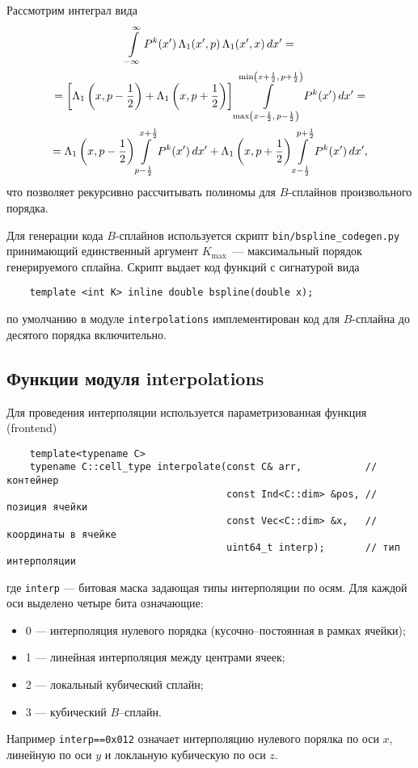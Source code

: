 Рассмотрим интеграл вида
\begin{multline}
  \int\limits_{-\infty}^{\infty} P^k(x')\,
  \Lambda_1(x',p)\,\Lambda_1(x', x)\, dx'
=\\=
\left[\Lambda_1\left(x,p-\frac12\right)+\Lambda_1\left(x,p+\frac12\right)\right]
\int\limits_{\max\left(x-\frac12,\,p-\frac12\right)}^{\min\left(x+\frac12,\,p+\frac12\right)}
P^k(x')\, dx'
=\\=
\Lambda_1\left(x,p-\frac12\right)\int\limits_{p-\frac12}^{x+\frac12} P^k(x')\,dx'
+
\Lambda_1\left(x,p+\frac12\right)\int\limits_{x-\frac12}^{p+\frac12} P^k(x')\,dx',
\notag
\end{multline}
что позволяет рекурсивно рассчитывать полиномы для $B$-сплайнов
произвольного порядка.

Для генерации кода $B$-сплайнов используется скрипт
\verb'bin/bspline_codegen.py' принимающий единственный аргумент $K_{\max}$~---
максимальный порядок генерируемого сплайна. Скрипт выдает код функций
с сигнатурой вида
\begin{verbatim}
    template <int K> inline double bspline(double x);
\end{verbatim}
по умолчанию в модуле \verb'interpolations' имплементирован код для
$B$-сплайна до десятого порядка включительно.


\subsection{Функции модуля {\sf interpolations}}
Для проведения интерполяции используется параметризованная функция (frontend)
\begin{verbatim}
    template<typename C>
    typename C::cell_type interpolate(const C& arr,           // контейнер
                                      const Ind<C::dim> &pos, // позиция ячейки
                                      const Vec<C::dim> &x,   // координаты в ячейке
                                      uint64_t interp);       // тип интерполяции
\end{verbatim}
где \verb'interp' --- битовая маска задающая типы интерполяции по
осям. Для каждой оси выделено четыре бита означающие:
\begin{itemize}
  \item 0 --- интерполяция нулевого порядка (кусочно--постоянная в
    рамках ячейки);
  \item 1 --- линейная интерполяция между центрами ячеек;
  \item 2 --- локальный кубический сплайн;
  \item 3 --- кубический $B$--сплайн.
\end{itemize}
Например \verb'interp==0x012' означает интерполяцию нулевого порялка
по оси $x$, линейную по оси $y$ и локлаьную кубическую по оси $z$. 



